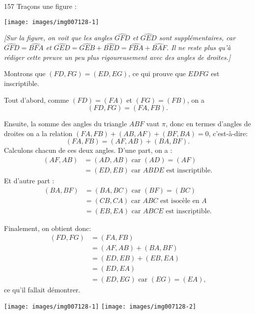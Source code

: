 \begin{Soln}{157}
Traçons une figure :

\begin{center}
\texttt{[image: images/img007128-1]}
\end{center}


\emph{[Sur la figure, on voit que les angles $\widehat{GFD}$ et $\widehat{GED}$ sont supplémentaires, car $\widehat{GFD}=\widehat{BFA}$ et $\widehat{GED}=\widehat{GEB}+\widehat{BED} = \widehat{FBA}+\widehat{BAF}$. Il ne reste plus qu'à rédiger cette preuve un peu plus rigoureusement avec des angles de droites.]}

Montrons que $(FD,FG)=(ED,EG)$, ce qui prouve que $EDFG$ est inscriptible.

Tout d'abord, comme $(FD)=(FA)$ et $(FG)=(FB)$, on a
\[(FD,FG)=(FA,FB).\]

Ensuite, la somme des angles du triangle $ABF$ vaut $\pi$, donc en termes d'angles de droites on a la relation
$(FA,FB)+(AB,AF)+(BF,BA)=0$, c'est-à-dire:
\[
(FA,FB) = (AF,AB)+(BA,BF).
\]
Calculons chacun de ces deux angles. D'une part, on a :
\begin{align*}
(AF,AB) &= (AD,AB) \text{ car $(AD)=(AF)$}\\
&=(ED,EB) \text{ car $ABDE$ est inscriptible}.
\end{align*}
Et d'autre part :
\begin{align*}
(BA,BF) &= (BA,BC) \text{ car $(BF)=(BC)$} \\
&= (CB,CA) \text{ car $ABC$ est isocèle en $A$}\\
&= (EB,EA) \text{ car $ABCE$ est inscriptible.}
\end{align*}

Finalement, on obtient donc:
\begin{align*}
(FD,FG)&=(FA,FB) \\
&= (AF,AB)+(BA,BF) \\
&= (ED,EB) + (EB,EA)\\
&= (ED,EA)\\
&= (ED,EG) \text{ car $(EG)=(EA)$,}
\end{align*}
ce qu'il fallait démontrer.
\begin{center}
\texttt{[image: images/img007128-1]}
\texttt{[image: images/img007128-2]}
\end{center}

\end{Soln}
